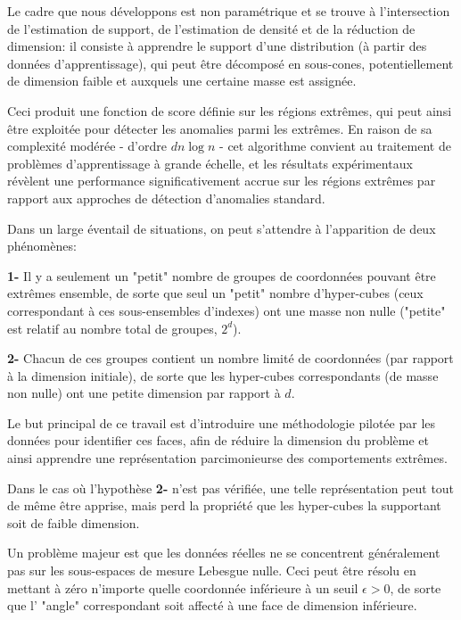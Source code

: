 Le cadre que nous développons est non paramétrique et se trouve à l'intersection de l'estimation de support, de l'estimation de densité et de la réduction de dimension: il consiste à apprendre le support d'une distribution (à partir des données d'apprentissage),  qui peut être décomposé en sous-cones, potentiellement de dimension faible et auxquels une certaine masse est assignée.%

Ceci produit une fonction de score définie sur les régions extrêmes, qui peut ainsi être exploitée pour détecter les anomalies parmi les extrêmes.
En raison de sa complexité modérée - d'ordre $ dn \log n $ - cet algorithme convient au traitement de problèmes d'apprentissage à grande échelle, et les résultats expérimentaux révèlent une performance significativement accrue sur les régions extrêmes par rapport aux approches de détection d'anomalies standard.


Dans un large éventail de situations, on peut s'attendre à l'apparition de deux phénomènes:

\textbf{1-} Il y a seulement un "petit" nombre de groupes de coordonnées pouvant être extrêmes ensemble, de sorte que seul un "petit" nombre d'hyper-cubes (ceux correspondant à ces sous-ensembles d'indexes) ont une masse non nulle ("petite" est relatif au nombre total de groupes, $2^d$).

\textbf{2-} Chacun de ces groupes contient un nombre limité de coordonnées (par rapport à la dimension initiale), de sorte que les hyper-cubes correspondants (de masse non nulle) ont une petite dimension par rapport à $ d $.

Le but principal de ce travail est d'introduire une méthodologie pilotée par les données pour identifier ces faces, afin de réduire la
dimension du problème et ainsi apprendre une représentation parcimonieurse des comportements extrêmes.

Dans le cas où l'hypothèse \textbf{2-} n'est pas vérifiée, une telle représentation peut tout de même être apprise, mais perd la propriété que les hyper-cubes la supportant soit de faible dimension.

Un problème majeur est que les données réelles ne se concentrent généralement pas sur les sous-espaces de mesure Lebesgue nulle. Ceci peut être résolu en mettant à zéro n'importe quelle coordonnée inférieure à un seuil $ \epsilon> 0 $, de sorte que l' "angle" correspondant soit affecté à une face de dimension inférieure.

